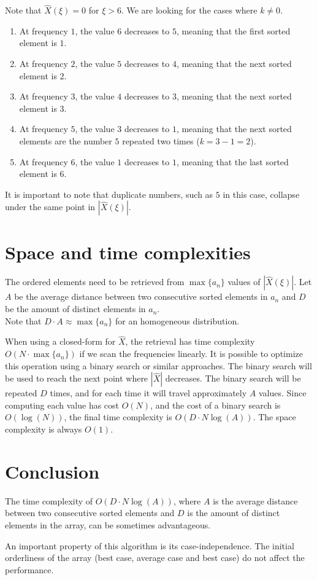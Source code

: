 \documentclass{article}
\begin{document}
Note that \(\hat{X}(\xi) = 0\) for \(\xi > 6\).
We are looking for the cases where \(k \neq 0\). \\
\begin{enumerate}
    \item At frequency \(1\), the value \(6\) decreases to \(5\), meaning that the first sorted element is \(1\).
    \item At frequency \(2\), the value \(5\) decreases to \(4\), meaning that the next sorted element is \(2\).
    \item At frequency \(3\), the value \(4\) decreases to \(3\), meaning that the next sorted element is \(3\).
    \item At frequency \(5\), the value \(3\) decreases to \(1\), meaning that the next sorted elements are the number \(5\)
    repeated two times (\(k=3-1=2\)).
    \item At frequency \(6\), the value \(1\) decreases to \(1\), meaning that the last sorted element is \(6\).
\end{enumerate}

It is important to note that duplicate numbers,
such as \(5\) in this case, collapse under the same
point in \(|\hat{X}(\xi)|\).

\section{Space and time complexities}

The ordered elements need to be retrieved from \(\max\{a_n\}\) values of
\(|\hat{X}(\xi)|\). Let \(A\) be the average distance between two consecutive sorted
elements in \(a_n\) and \(D\) be the amount of distinct elements in \(a_n\).\\
Note that \(D \cdot A \approx \max\{a_n\}\) for an homogeneous distribution.

When using a closed-form for \(\hat{X}\), the retrieval has time complexity
\(O(N \cdot \max\{a_n\})\) if we scan the frequencies linearly.
It is possible to optimize this operation using a binary search or similar approaches.
The binary search will be used to reach the next point where \(|\hat{X}|\) decreases.
The binary search will be repeated \(D\) times, and for each time
it will travel approximately \(A\) values. Since computing each value has cost \(O(N)\),
and the cost of a binary search is \(O(\log(N))\),
the final time complexity is \(O(D \cdot N \log(A))\).
The space complexity is always \(O(1)\).

\section{Conclusion}

The time complexity of \(O(D \cdot N \log(A))\), where \(A\)
is the average distance between two consecutive sorted
elements and \(D\) is the amount of distinct elements in the array,
can be sometimes advantageous.

An important property of this algorithm is its case-independence.
The initial orderliness of the array (best case, average case and best case)
do not affect the performance.

\nocite{*} %

\printbibliography
\end{document}
